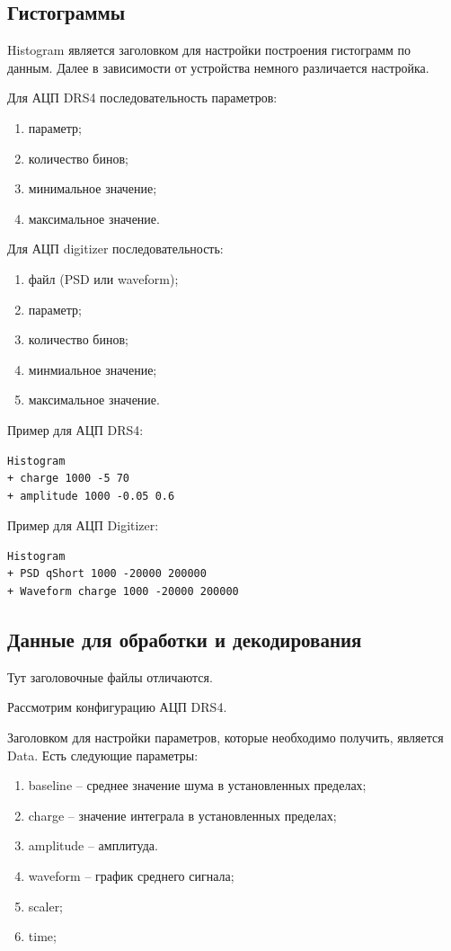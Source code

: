 \documentclass[12pt,a4paper,openany]{article}
\begin{document}
\subsection{Гистограммы}
Histogram является заголовком для настройки построения гистограмм по данным.
Далее в зависимости от устройства немного различается настройка.

Для АЦП DRS4 последовательность параметров:
\begin{enumerate}
    \item параметр;
    \item количество бинов;
    \item минимальное значение;
    \item максимальное значение.
\end{enumerate}

Для АЦП digitizer последовательность:
\begin{enumerate}
    \item файл (PSD или waveform);
    \item параметр;
    \item количество бинов;
    \item минмиальное значение;
    \item максимальное значение.
\end{enumerate}

Пример для АЦП DRS4:
\begin{lstlisting}
Histogram
+ charge 1000 -5 70
+ amplitude 1000 -0.05 0.6
\end{lstlisting}

Пример для АЦП Digitizer:
\begin{lstlisting}
Histogram
+ PSD qShort 1000 -20000 200000
+ Waveform charge 1000 -20000 200000
\end{lstlisting}

\subsection{Данные для обработки и декодирования}
Тут заголовочные файлы отличаются.

Рассмотрим конфигурацию АЦП DRS4.

Заголовком для настройки параметров, которые необходимо получить, является Data. Есть следующие параметры:
\begin{enumerate}
    \item baseline -- среднее значение шума в установленных пределах;
    \item charge -- значение интеграла в установленных пределах;
    \item amplitude -- амплитуда.
    \item waveform -- график среднего сигнала;
    \item scaler;
    \item time;
\end{enumerate}
\end{document}
